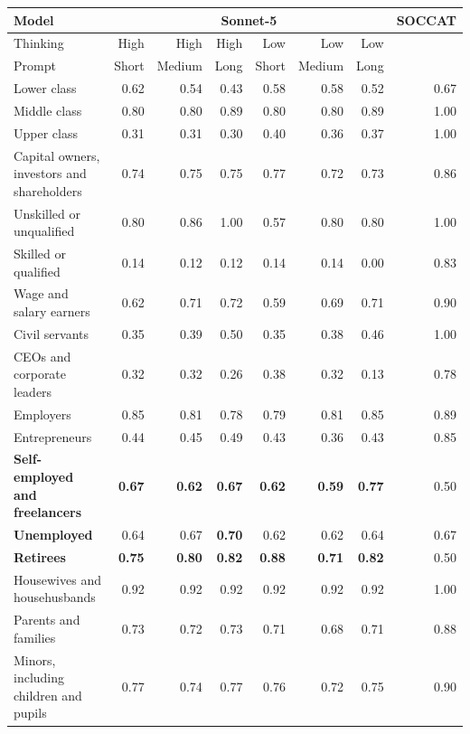 \begin{table}[htb]
\centering
\scriptsize
\begin{tabular}{>{\raggedright\arraybackslash}p{4.2cm} r r r r r r r}
\toprule
Model & \multicolumn{6}{c}{Sonnet-5} & SOCCAT \\
\cmidrule(lr){2-7}
Thinking & High & High & High & Low & Low & Low &  \\
Prompt & Short & Medium & Long & Short & Medium & Long &  \\
\midrule
Lower class & 0.62 & 0.54 & 0.43 & 0.58 & 0.58 & 0.52 & 0.67 \\
Middle class & 0.80 & 0.80 & 0.89 & 0.80 & 0.80 & 0.89 & 1.00 \\
Upper class & 0.31 & 0.31 & 0.30 & 0.40 & 0.36 & 0.37 & 1.00 \\
Capital owners, investors and shareholders & 0.74 & 0.75 & 0.75 & 0.77 & 0.72 & 0.73 & 0.86 \\
Unskilled or unqualified & 0.80 & 0.86 & 1.00 & 0.57 & 0.80 & 0.80 & 1.00 \\
Skilled or qualified & 0.14 & 0.12 & 0.12 & 0.14 & 0.14 & 0.00 & 0.83 \\
\addlinespace
Wage and salary earners & 0.62 & 0.71 & 0.72 & 0.59 & 0.69 & 0.71 & 0.90 \\
Civil servants & 0.35 & 0.39 & 0.50 & 0.35 & 0.38 & 0.46 & 1.00 \\
CEOs and corporate leaders & 0.32 & 0.32 & 0.26 & 0.38 & 0.32 & 0.13 & 0.78 \\
Employers & 0.85 & 0.81 & 0.78 & 0.79 & 0.81 & 0.85 & 0.89 \\
Entrepreneurs & 0.44 & 0.45 & 0.49 & 0.43 & 0.36 & 0.43 & 0.85 \\
\textbf{Self-employed and freelancers} & \textbf{0.67} & \textbf{0.62} & \textbf{0.67} & \textbf{0.62} & \textbf{0.59} & \textbf{0.77} & 0.50 \\
\textbf{Unemployed} & 0.64 & 0.67 & \textbf{0.70} & 0.62 & 0.62 & 0.64 & 0.67 \\
\textbf{Retirees} & \textbf{0.75} & \textbf{0.80} & \textbf{0.82} & \textbf{0.88} & \textbf{0.71} & \textbf{0.82} & 0.50 \\
Housewives and househusbands & 0.92 & 0.92 & 0.92 & 0.92 & 0.92 & 0.92 & 1.00 \\
\addlinespace
Parents and families & 0.73 & 0.72 & 0.73 & 0.71 & 0.68 & 0.71 & 0.88 \\
Minors, including children and pupils & 0.77 & 0.74 & 0.77 & 0.76 & 0.72 & 0.75 & 0.90 \\

\end{tabular}
\end{table}

